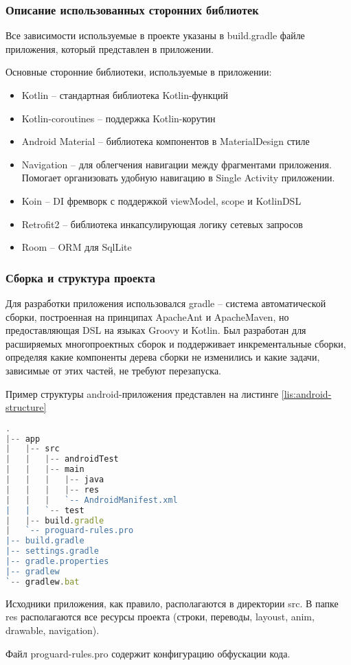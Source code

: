 \subsubsection{Описание использованных сторонних библиотек}\indent
Все зависимости используемые в проекте указаны в build.gradle файле приложения, который представлен в приложении.

Основные сторонние библиотеки, используемые в приложении:
\begin{itemize}
    \item Kotlin – стандартная библиотека Kotlin-функций
    \item Kotlin-coroutines – поддержка Kotlin-корутин
    \item Android Material – библиотека компонентов в MaterialDesign стиле
    \item Navigation – для облегчения навигации между фрагментами приложения. Помогает организовать удобную навигацию в Single Activity приложении.
    \item Koin – DI фремворк с поддержкой viewModel, scope и KotlinDSL
    \item Retrofit2 – библиотека инкапсулирующая логику сетевых запросов
    \item Room – ORM для SqlLite
\end{itemize}

\subsubsection{Сборка и структура проекта}\indent
Для разработки приложения использовался gradle – система автоматической сборки, построенная на принципах ApacheAnt и ApacheMaven, но предоставляющая DSL на языках Groovy и Kotlin.
Был разработан для расширяемых многопроектных сборок и поддерживает инкрементальные сборки, определяя какие компоненты дерева сборки не изменились и какие задачи, зависимые от этих частей, не требуют перезапуска.

Пример структуры android-приложения представлен на листинге \ref{lis:android-structure}

\begin{lstlisting}[language=TypeScript, captionpos=b,
label={lis:android-structure},
caption={Пример структуры Android приложения}
]
.
|-- app
|   |-- src
|   |   |-- androidTest
|   |   |-- main
|   |   |   |-- java
|   |   |   |-- res
|   |   |   `-- AndroidManifest.xml
|   |   `-- test
|   |-- build.gradle
|   `-- proguard-rules.pro
|-- build.gradle
|-- settings.gradle
|-- gradle.properties
|-- gradlew
`-- gradlew.bat
\end{lstlisting}

Исходники приложения, как правило, располагаются в директории src. В папке res располагаются все ресурсы проекта (строки, переводы, layoust, anim, drawable, navigation).

Файл proguard-rules.pro содержит конфигурацию обфускации кода.
